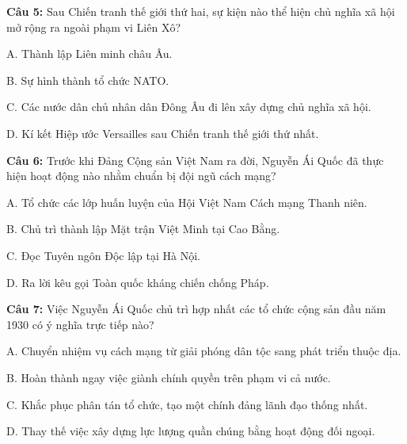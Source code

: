 \documentclass[12pt,a4paper]{article}
\begin{document}
\par\noindent\begin{minipage}{\linewidth}
\noindent\textbf{Câu 5:} Sau Chiến tranh thế giới thứ hai, sự kiện nào thể hiện chủ nghĩa xã hội mở rộng ra ngoài phạm vi Liên Xô?\par
\noindent A. Thành lập Liên minh châu Âu.\par
\noindent B. Sự hình thành tổ chức NATO.\par
\noindent C. Các nước dân chủ nhân dân Đông Âu đi lên xây dựng chủ nghĩa xã hội.\par
\noindent D. Kí kết Hiệp ước Versailles sau Chiến tranh thế giới thứ nhất.\par
\end{minipage}\par\vspace{0.12cm}

\par\noindent\begin{minipage}{\linewidth}
\noindent\textbf{Câu 6:} Trước khi Đảng Cộng sản Việt Nam ra đời, Nguyễn Ái Quốc đã thực hiện hoạt động nào nhằm chuẩn bị đội ngũ cách mạng?\par
\noindent A. Tổ chức các lớp huấn luyện của Hội Việt Nam Cách mạng Thanh niên.\par
\noindent B. Chủ trì thành lập Mặt trận Việt Minh tại Cao Bằng.\par
\noindent C. Đọc Tuyên ngôn Độc lập tại Hà Nội.\par
\noindent D. Ra lời kêu gọi Toàn quốc kháng chiến chống Pháp.\par
\end{minipage}\par\vspace{0.12cm}

\par\noindent\begin{minipage}{\linewidth}
\noindent\textbf{Câu 7:} Việc Nguyễn Ái Quốc chủ trì hợp nhất các tổ chức cộng sản đầu năm 1930 có ý nghĩa trực tiếp nào?\par
\noindent A. Chuyển nhiệm vụ cách mạng từ giải phóng dân tộc sang phát triển thuộc địa.\par
\noindent B. Hoàn thành ngay việc giành chính quyền trên phạm vi cả nước.\par
\noindent C. Khắc phục phân tán tổ chức, tạo một chính đảng lãnh đạo thống nhất.\par
\noindent D. Thay thế việc xây dựng lực lượng quần chúng bằng hoạt động đối ngoại.\par
\end{minipage}\par\vspace{0.12cm}
\end{document}
